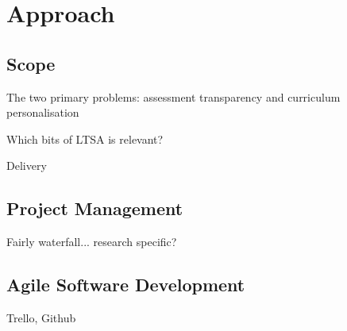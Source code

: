 \chapter{Approach}

\section{Scope}

The two primary problems: assessment transparency and curriculum personalisation

Which bits of LTSA is relevant?

Delivery

\section{Project Management}

Fairly waterfall... research specific?

\section{Agile Software Development}

Trello, Github


